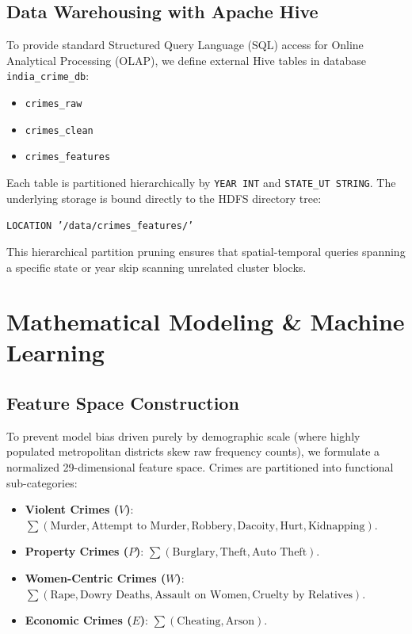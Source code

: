 \documentclass[conference]{IEEEtran}
\begin{document}
\subsection{Data Warehousing with Apache Hive}
To provide standard Structured Query Language (SQL) access for Online Analytical Processing (OLAP), we define external Hive tables in database \texttt{india\_crime\_db}:
\begin{itemize}
    \item \texttt{crimes\_raw}
    \item \texttt{crimes\_clean}
    \item \texttt{crimes\_features}
\end{itemize}
Each table is partitioned hierarchically by \texttt{YEAR INT} and \texttt{STATE\_UT STRING}. The underlying storage is bound directly to the HDFS directory tree:
\begin{center}
\texttt{LOCATION '/data/crimes\_features/'}
\end{center}
This hierarchical partition pruning ensures that spatial-temporal queries spanning a specific state or year skip scanning unrelated cluster blocks.

\section{Mathematical Modeling \& Machine Learning}

\subsection{Feature Space Construction}
To prevent model bias driven purely by demographic scale (where highly populated metropolitan districts skew raw frequency counts), we formulate a normalized 29-dimensional feature space. Crimes are partitioned into functional sub-categories:
\begin{itemize}
    \item \textbf{Violent Crimes ($V$)}: $\sum(\text{Murder}, \text{Attempt to Murder}, \text{Robbery}, \text{Dacoity}, \text{Hurt}, \text{Kidnapping})$.
    \item \textbf{Property Crimes ($P$)}: $\sum(\text{Burglary}, \text{Theft}, \text{Auto Theft})$.
    \item \textbf{Women-Centric Crimes ($W$)}: $\sum(\text{Rape}, \text{Dowry Deaths}, \text{Assault on Women}, \text{Cruelty by Relatives})$.
    \item \textbf{Economic Crimes ($E$)}: $\sum(\text{Cheating}, \text{Arson})$.
\end{itemize}
\end{document}
